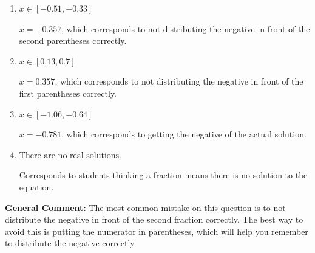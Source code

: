 \documentclass{extbook}[14pt]
\begin{document}
\begin{enumerate}
{\begin{enumerate}[label=\Alph*.]
* $x = -0.071$, which is the correct option.
\item \( x \in [-0.51, -0.33] \)

$x = -0.357$, which corresponds to not distributing the negative in front of the second parentheses correctly.
\item \( x \in [0.13, 0.7] \)

$x = 0.357$, which corresponds to not distributing the negative in front of the first parentheses correctly.
\item \( x \in [-1.06, -0.64] \)

$x = -0.781$, which corresponds to getting the negative of the actual solution.
\item \( \text{There are no real solutions.} \)

Corresponds to students thinking a fraction means there is no solution to the equation.
\end{enumerate}

\textbf{General Comment:} The most common mistake on this question is to not distribute the negative in front of the second fraction correctly. The best way to avoid this is putting the numerator in parentheses, which will help you remember to distribute the negative correctly.
}
\end{enumerate}
\end{document}
